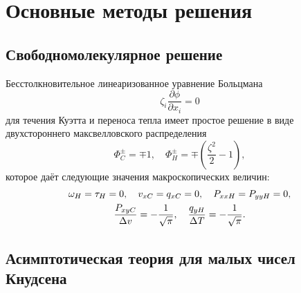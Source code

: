 \documentclass[a4paper,12pt]{article}
\newcommand{\pder}[2][]{\frac{\partial#1}{\partial#2}}
\begin{document}
\section{Основные методы решения}

\subsection{Свободномолекулярное решение}

Бесстолкновительное линеаризованное уравнение Больцмана
\begin{equation}\label{eq:linear_free}
    \zeta_i \pder[\phi]{x_i} = 0
\end{equation}
для течения Куэтта и переноса тепла имеет простое решение
в виде двухстороннего максвелловского распределения
\begin{equation}\label{eq:free_solution}
    \Phi_C^\pm = \mp 1, \quad
    \Phi_H^\pm = \mp \left(\frac{\zeta^2}{2}-1\right),
\end{equation}
которое даёт следующие значения макроскопических величин:
\begin{gather}\label{eq:free_macro}
    \omega_{H} = \tau_{H} = 0, \quad
    v_{xC} = q_{xC} = 0, \quad
    P_{xxH} = P_{yyH} = 0, \notag \\
    \frac{P_{xyC}}{\Delta{v}} = -\frac1{\sqrt\pi}, \quad
    \frac{q_{yH}}{\Delta{T}} = -\frac1{\sqrt\pi}.
\end{gather}

\subsection{Асимптотическая теория для малых чисел Кнудсена}
\end{document}
